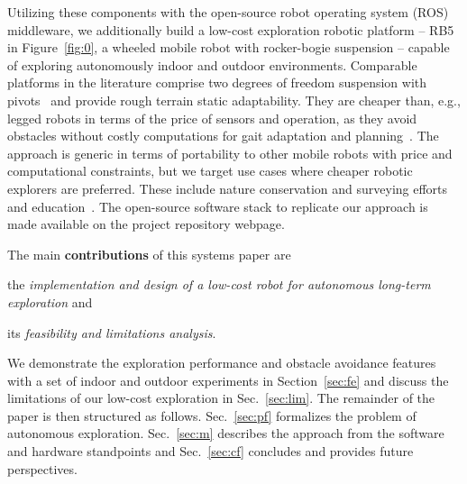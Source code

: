 \documentclass[letterpaper,10pt,conference,twoside]{IEEEtran}
\makeatletter
\theoremstyle{definition}
\newcommand\footnoteref[1]{\protected@xdef\@thefnmark{\ref{#1}}\@footnotemark}
\makeatother
\begin{document}
Utilizing these components %
with the open-source robot operating system (ROS) middleware, we additionally build  
a low-cost %
exploration %
robotic platform -- RB5 in Figure~\ref{fig:0}, a wheeled mobile robot with rocker-bogie suspension -- capable of exploring autonomously indoor and outdoor environments. 
Comparable platforms in the literature comprise two degrees of freedom suspension with pivots~\cite{setterfield2013terrain,%
faisal2021low} and provide rough terrain static adaptability. %
They are cheaper than, e.g., legged robots in terms of the price of sensors %
and operation, as they %
avoid obstacles without costly computations for gait adaptation and planning~\cite{muller2021openbot}.
The approach is generic in terms of portability to other mobile robots with price and computational constraints, but we target use cases where cheaper robotic explorers are preferred. These include nature conservation and surveying efforts~\cite{kirchgeorg2022multimodal} and education~\cite{betz2022autonomous,amster2020turtlebot}. %
The open-source software stack to replicate our approach is made available on the project repository webpage\footnoteref{link}.

The main \textbf{contributions} of this systems paper are 
\begin{enumerate*}[label={(\roman*)},font={\textit}]
  \item the \textit{implementation and design of a low-cost robot for autonomous long-term exploration} and 
  \item its \textit{feasibility and limitations analysis}. %
\end{enumerate*}
We demonstrate the exploration performance and obstacle avoidance features %
with a set of indoor and outdoor %
experiments in Section~\ref{sec:fe} and discuss the limitations of our low-cost exploration in Sec.~\ref{sec:lim}. The remainder of the paper is then structured as follows. Sec.~\ref{sec:pf} formalizes the problem of autonomous exploration. Sec.~\ref{sec:m} describes the approach from the software and hardware standpoints and Sec.~\ref{sec:cf} concludes and provides future perspectives.
\end{document}
